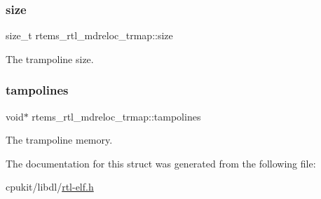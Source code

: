 \subsubsection{\texorpdfstring{size}{size}}
{\footnotesize\ttfamily size\+\_\+t rtems\+\_\+rtl\+\_\+mdreloc\+\_\+trmap\+::size}

The trampoline size. \mbox{\label{structrtems__rtl__mdreloc__trmap_a1fb87f69a2d2e50401ab0450f9c372d3}} 
\subsubsection{\texorpdfstring{tampolines}{tampolines}}
{\footnotesize\ttfamily void$\ast$ rtems\+\_\+rtl\+\_\+mdreloc\+\_\+trmap\+::tampolines}

The trampoline memory. 

The documentation for this struct was generated from the following file\+:\begin{DoxyCompactItemize}
\item 
cpukit/libdl/\mbox{\hyperlink{rtl-elf_8h}{rtl-\/elf.\+h}}\end{DoxyCompactItemize}
